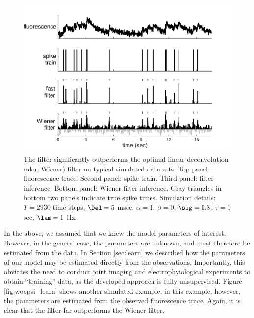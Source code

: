 \begin{figure}[h!]
\centering \includegraphics[width=.9\linewidth]{../figs/woopsi_inf}
\caption{The \foopsi filter significantly outperforms the optimal linear deconvolution (aka, Wiener) filter on typical simulated data-sets. Top panel: fluorescence trace.  Second panel: spike train.  Third panel: \foopsi filter inference.  Bottom panel: Wiener filter inference.  Gray triangles in bottom two panels indicate true spike times.  Simulation details: $T=2930$ time steps, $\Del=5$ msec, $\alpha=1$, $\beta=0$, $\sig=0.3$, $\tau=1$ sec, $\lam=1$ Hz.} \label{fig:woopsi_inf}
\end{figure}


In the above, we assumed that we knew the model parameters of interest.  However, in the general case, the parameters are unknown, and must therefore be estimated from the data.  In Section \ref{sec:learn} we described how the parameters of our model may be estimated directly from the observations.  Importantly, this obviates the need to conduct joint imaging and electrophyiological experiments to obtain ``training'' data, as the developed approach is fully unsupervised.  Figure \ref{fig:woopsi_learn} shows another simulated example; in this example, however, the parameters are estimated from the observed fluorescence trace.  Again, it is clear that the \foopsi filter far outperforms the Wiener filter.

